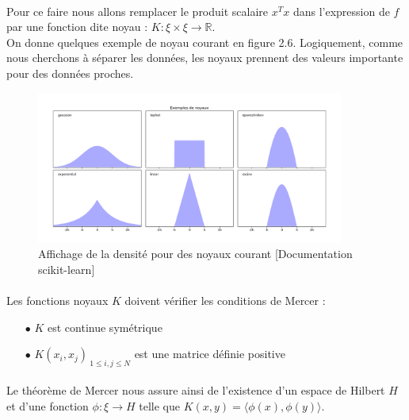 \documentclass[a4paper,12pt,titlepage]{report}
\begin{document}
\paragraph{}
Pour ce faire nous allons remplacer le produit scalaire $x^T x$ dans l'expression de $f$ par une fonction dite \og noyau \fg : $K : \xi \times \xi \rightarrow \mathbb{R}$. \\
On donne quelques exemple de noyau courant en figure 2.6. Logiquement, comme nous cherchons à séparer les données, les noyaux prennent des valeurs importante pour des données proches.

\begin{figure}[!h]
	\begin{center}
		\includegraphics[height = 5cm, keepaspectratio]{graphes/exemple_noyaux.png}
		\caption{Affichage de la densité pour des noyaux courant [Documentation scikit-learn]}
	\end{center}
\end{figure}

\paragraph{}
Les fonctions noyaux $K$ doivent vérifier les conditions de Mercer :
\begin{itemize}
\item[$\bullet$]  $K$ est continue symétrique 
\item[$\bullet$]  $K(x_i,x_j)_{\ 1 \leqslant i,j \leqslant N}$ est une matrice définie positive
\end{itemize}
\paragraph{}
Le théorème de Mercer nous assure ainsi de l'existence d'un espace de Hilbert $H$ et d'une fonction $\phi :\xi \rightarrow H$ telle que $K(x,y) = \langle\phi(x),\phi(y)\rangle$.
\end{document}
